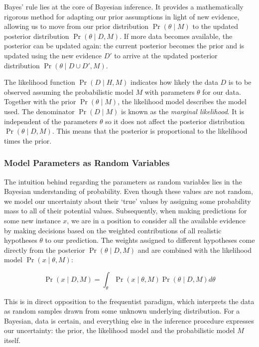 Bayes' rule lies at the core of Bayesian inference. It provides a mathematically rigorous method for adapting our prior assumptions in light of new evidence, allowing us to move from our prior distribution $\Pr( \theta \mid M)$ to the updated posterior distribution $\Pr ( \theta \mid D, M) $. If more data becomes available, the posterior can be updated again: the current posterior becomes the prior and is updated using the new evidence $D'$ to arrive at the updated posterior distribution $\Pr ( \theta \mid D \cup D', M )$.

The likelihood function $\Pr(D \mid H, M)$ indicates how likely the data $D$ is to be observed assuming the probabilistic model $M$ with parameters $\theta$ for our data. Together with the prior $\Pr(\theta \mid M)$, the likelihood model describes the model used. The denominator $\Pr (D \mid M)$ is known as the \emph{marginal likelihood}. It is independent of the parameters $\theta$ so it does not affect the posterior distribution $\Pr (\theta \mid D, M)$. This means that the posterior is proportional to the likelihood times the prior. 

\subsubsection*{Model Parameters as Random Variables}

The intuition behind regarding the parameters as random variables lies in the Bayesian understanding of probability. Even though these values are not random, we model our uncertainty about their `true' values by assigning some probability mass to all of their potential values. Subsequently, when making predictions for some new instance $x$, we are in a position to consider all the available evidence by making decisions based on the weighted contributions of all realistic hypotheses $\theta$ to our prediction. The weights assigned to different hypotheses come directly from the posterior $\Pr(\theta \mid D, M)$ and are combined with the likelihood model $\Pr (x \mid \theta, M)$:

\begin{equation*}  \Pr(x \mid D, M) = \int_{\theta}{ \Pr(x \mid \theta, M) } \Pr ( \theta \mid D, M) d\theta  \end{equation*}

This is in direct opposition to the frequentist paradigm, which interprets the data as random samples drawn from some unknown underlying distribution. For a Bayesian, data is certain, and everything else in the inference procedure expresses our uncertainty: the prior, the likelihood model and the probabilistic model $M$ itself.  

